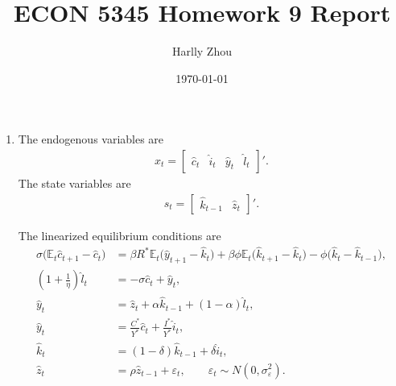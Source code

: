 \documentclass[12pt]{article}
\title{ECON 5345 Homework 9 Report}
\author{Harlly Zhou}
\date{\today}
\begin{document}
\maketitle

\begin{enumerate}[label=\arabic*.]

\item The endogenous variables are
\begin{align*}
    x_t =
    \begin{bmatrix}
        \hat{c}_t & \hat{i}_t & \hat{y}_t & \hat{l}_t
    \end{bmatrix}'.
\end{align*}
The state variables are
\begin{align*}
    s_t =
    \begin{bmatrix}
        \hat{k}_{t-1} & \hat{z}_t
    \end{bmatrix}'.
\end{align*}

The linearized equilibrium conditions are
\begin{align}
\sigma \bigl(\mathbb{E}_t \hat{c}_{t+1} - \hat{c}_t\bigr)
&=
\beta R^* \mathbb{E}_t \bigl(\hat{y}_{t+1} - \hat{k}_t\bigr)
  + \beta \phi \mathbb{E}_t \bigl(\hat{k}_{t+1} - \hat{k}_t\bigr)
  - \phi \bigl(\hat{k}_t - \hat{k}_{t-1}\bigr), \label{eq:ll_euler}\\
\left(1 + \frac{1}{\eta}\right)\hat{l}_t
&= -\sigma \hat{c}_t + \hat{y}_t, \label{eq:ll_foc_l}\\
\hat{y}_t
&= \hat{z}_t + \alpha \hat{k}_{t-1} + (1-\alpha)\hat{l}_t, \label{eq:ll_production}\\
\hat{y}_t
&= \frac{C^*}{Y^*}\hat{c}_t + \frac{I^*}{Y^*}\hat{i}_t, \label{eq:ll_resource}\\
\hat{k}_t
&= (1-\delta)\hat{k}_{t-1} + \delta \hat{i}_t, \label{eq:ll_lom}\\
\hat{z}_t
&= \rho \hat{z}_{t-1} + \varepsilon_t, \qquad \varepsilon_t \sim N(0,\sigma_\varepsilon^2). \label{eq:ll_productivity}
\end{align}


\end{enumerate}
\end{document}
